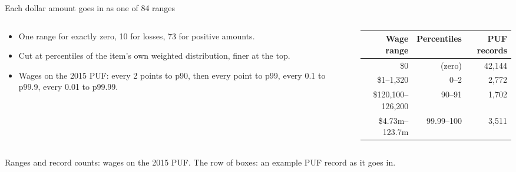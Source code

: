 \documentclass[11pt,aspectratio=169]{beamer}
\newcommand{\slidenote}[1]{\par\vfill{\scriptsize\color{yalegrey}#1}}
\begin{document}
\begin{frame}{Each dollar amount goes in as one of 84 ranges}
  \begin{columns}[T]
    \begin{column}{0.47\textwidth}
      \small
      \begin{itemize}
        \item One range for exactly zero, 10 for losses, 73 for positive amounts.
        \item Cut at percentiles of the item's own weighted distribution, finer at the top.
        \item Wages on the 2015 PUF: every 2 points to p90, then every point to p99,
              every 0.1 to p99.9, every 0.01 to p99.99.
      \end{itemize}
    \end{column}
    \begin{column}{0.5\textwidth}
      \centering\small
      \begin{tabular}{rrr}
        \toprule
        Wage range & Percentiles & PUF records \\
        \midrule
        \$0            & (zero)      & 42,144 \\
        \$1--1,320      & 0--2        & 2,772 \\
        \$120,100--126,200 & 90--91    & 1,702 \\
        \$4.73m--123.7m  & 99.99--100 & 3,511 \\
        \bottomrule
      \end{tabular}
    \end{column}
  \end{columns}

  \vspace{1em}
  \centering
  \slidenote{Ranges and record counts: wages on the 2015 PUF. The row of boxes: an example PUF record as it goes in.}
\end{frame}
\end{document}
